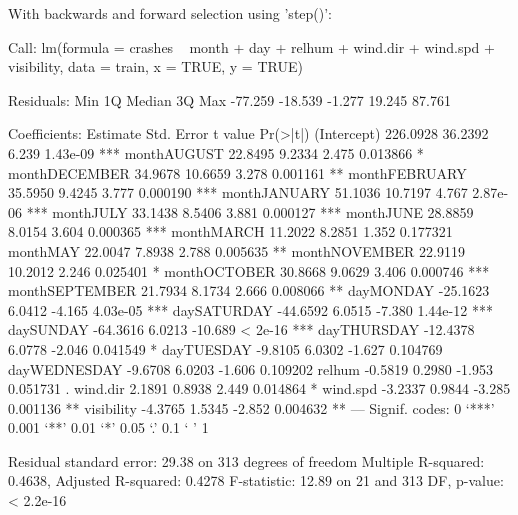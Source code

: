 \documentclass[11pt, a4paper]{article}
\begin{document}
\begin{Schunk}
\begin{Soutput}
With backwards and forward selection using 'step()':
\end{Soutput}
\begin{Soutput}
Call:
lm(formula = crashes ~ month + day + relhum + wind.dir + wind.spd + 
    visibility, data = train, x = TRUE, y = TRUE)

Residuals:
    Min      1Q  Median      3Q     Max 
-77.259 -18.539  -1.277  19.245  87.761 

Coefficients:
               Estimate Std. Error t value Pr(>|t|)    
(Intercept)    226.0928    36.2392   6.239 1.43e-09 ***
monthAUGUST     22.8495     9.2334   2.475 0.013866 *  
monthDECEMBER   34.9678    10.6659   3.278 0.001161 ** 
monthFEBRUARY   35.5950     9.4245   3.777 0.000190 ***
monthJANUARY    51.1036    10.7197   4.767 2.87e-06 ***
monthJULY       33.1438     8.5406   3.881 0.000127 ***
monthJUNE       28.8859     8.0154   3.604 0.000365 ***
monthMARCH      11.2022     8.2851   1.352 0.177321    
monthMAY        22.0047     7.8938   2.788 0.005635 ** 
monthNOVEMBER   22.9119    10.2012   2.246 0.025401 *  
monthOCTOBER    30.8668     9.0629   3.406 0.000746 ***
monthSEPTEMBER  21.7934     8.1734   2.666 0.008066 ** 
dayMONDAY      -25.1623     6.0412  -4.165 4.03e-05 ***
daySATURDAY    -44.6592     6.0515  -7.380 1.44e-12 ***
daySUNDAY      -64.3616     6.0213 -10.689  < 2e-16 ***
dayTHURSDAY    -12.4378     6.0778  -2.046 0.041549 *  
dayTUESDAY      -9.8105     6.0302  -1.627 0.104769    
dayWEDNESDAY    -9.6708     6.0203  -1.606 0.109202    
relhum          -0.5819     0.2980  -1.953 0.051731 .  
wind.dir         2.1891     0.8938   2.449 0.014864 *  
wind.spd        -3.2337     0.9844  -3.285 0.001136 ** 
visibility      -4.3765     1.5345  -2.852 0.004632 ** 
---
Signif. codes:  0 ‘***’ 0.001 ‘**’ 0.01 ‘*’ 0.05 ‘.’ 0.1 ‘ ’ 1

Residual standard error: 29.38 on 313 degrees of freedom
Multiple R-squared:  0.4638,	Adjusted R-squared:  0.4278 
F-statistic: 12.89 on 21 and 313 DF,  p-value: < 2.2e-16
\end{Soutput}
\end{Schunk}
\end{document}
